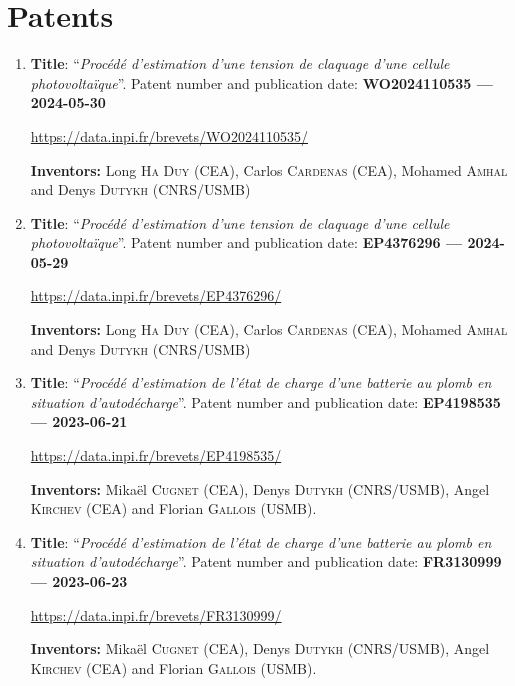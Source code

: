 \documentclass[final, a4paper, oneside, 12pt]{article}
\numberwithin{equation}{section}
\begin{document}
\section{Patents}

\begin{enumerate}

  \item \textbf{Title}: ``\textit{Proc\'ed\'e d'estimation d'une tension de claquage d'une cellule photovolta\"ique}''. Patent number and publication date: \textbf{WO2024110535  
 --- 2024-05-30}

 \url{https://data.inpi.fr/brevets/WO2024110535/}

 \textbf{Inventors:} Long \textsc{Ha Duy} (CEA), Carlos \textsc{Cardenas} (CEA), Mohamed \textsc{Amhal} and Denys \textsc{Dutykh} (CNRS/USMB)


  \item \textbf{Title}: ``\textit{Proc\'ed\'e d'estimation d'une tension de claquage d'une cellule photovolta\"ique}''. Patent number and publication date: \textbf{EP4376296 
 --- 2024-05-29}

 \url{https://data.inpi.fr/brevets/EP4376296/}

 \textbf{Inventors:} Long \textsc{Ha Duy} (CEA), Carlos \textsc{Cardenas} (CEA), Mohamed \textsc{Amhal} and Denys \textsc{Dutykh} (CNRS/USMB)


  \item \textbf{Title}: ``\textit{Proc\'ed\'e d'estimation de l'\'etat de charge d'une batterie au plomb en situation d'autod\'echarge}''. Patent number and publication date: \textbf{EP4198535 --- 2023-06-21}
  
  \url{https://data.inpi.fr/brevets/EP4198535/}
  
  \textbf{Inventors:} Mika\"el \textsc{Cugnet} (CEA), Denys \textsc{Dutykh} (CNRS/USMB), Angel \textsc{Kirchev} (CEA) and Florian \textsc{Gallois} (USMB).
  

  \item \textbf{Title}: ``\textit{Proc\'ed\'e d'estimation de l'\'etat de charge d'une batterie au plomb en situation d'autod\'echarge}''. Patent number and publication date: \textbf{FR3130999 --- 2023-06-23}
  
  \url{https://data.inpi.fr/brevets/FR3130999/}
  
  \textbf{Inventors:} Mika\"el \textsc{Cugnet} (CEA), Denys \textsc{Dutykh} (CNRS/USMB), Angel \textsc{Kirchev} (CEA) and Florian \textsc{Gallois} (USMB).
  

\end{enumerate}
\end{document}
